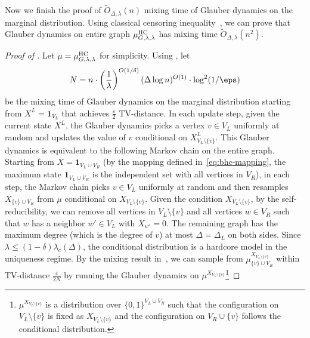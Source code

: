 \documentclass[11pt,a4paper]{article}
\renewcommand{\epsilon}{\varepsilon}
\theoremstyle{definition}
\def\*#1{\mathbf{#1}} %
\begin{document}
Now we finish the proof of $\tilde{O}_{\Delta,\lambda}(n)$ mixing time of Glauber dynamics on the marginal distribution. Using classical censoring inequality~\cite{peres2013can}, we can  prove that Glauber dynamics on entire graph $\mu^{\textnormal{HC}}_{G,\lambda,\lambda}$ has mixing time $\tilde{O}_{\Delta,\lambda}(n^2)$. %


\begin{proof}[Proof of ]
Let $\mu=\mu_{G,\lambda,\lambda}^{\textnormal{HC}}$ for simplicity.
Using ,
let 
\[N=n\cdot \left(\frac{1}{\lambda} \right)^{O(1/\delta)}(\Delta\log n)^{O(1)}\cdot \log^2 (1/\eps)\]
be the mixing time of Glauber dynamics on the marginal distribution starting from $X^L = \*1_{V_L}$ that achieves $\frac{\epsilon}{2}$ TV-distance.
 In each update step, given the current state $X^L$, the Glauber dynamics picks a vertex $v \in V_L$ uniformly at random and updates the value of $v$ conditional on $X^L_{V_L \setminus \{v\}}$. This Glauber dynamics is equivalent to the following Markov chain on the entire graph. Starting from $X = \*1_{V_L \cup V_R}$ (by the mapping defined in~\eqref{eq:bhc-mapping}, the maximum state $\*1_{V_L \cup V_R}$ is the independent set with all vertices in $V_R$), in each step, the Markov chain picks $v \in V_L$ uniformly at random and then resamples $X_{\{v\} \cup V_R}$ from $\mu$ conditional on $X_{V_L \setminus \{v\}}$. Given the condition $X_{V_L \setminus \{v\}}$, by the self-reducibility, we can remove all vertices in $V_L \setminus \{v\}$ and all vertices $w \in V_R$ such that $w$ has a neighbor $w' \in V_L$ with $X_{w'} = 0$. The remaining graph has the maximum degree (which is the degree of $v$) at most $\Delta = \Delta_L$ on both sides. Since $\lambda \leq (1-\delta)\lambda_c(\Delta)$, the conditional distribution is a hardcore model in the uniqueness regime.  By the mixing result in~\cite{CFYZ22,ChenE22}, we can sample from $\mu_{\{v\} \cup V_R}^{X_{V_L \setminus \{v\}}}$ within TV-distance $\frac{\epsilon}{2N}$ by running the Glauber dynamics on $\mu^{X_{V_L \setminus \{v\}}}$\footnote{$\mu^{X_{V_L \setminus \{v\}}}$
 is a distribution over $\{0,1\}^{V_L \cup V_R}$ such that the configuration on $V_L \setminus \{v\}$ is fixed as  $X_{V_L \setminus \{v\}}$ and the configuration on $V_R \cup \{v\}$ follows the conditional distribution.} 

\end{proof}
\end{document}
